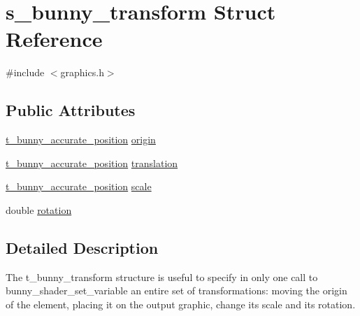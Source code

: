 \hypertarget{structs__bunny__transform}{\section{s\-\_\-bunny\-\_\-transform Struct Reference}
\label{structs__bunny__transform}
}


{\ttfamily \#include $<$graphics.\-h$>$}

\subsection*{Public Attributes}
\begin{DoxyCompactItemize}
\item 
\hyperlink{placement_8h_a0871582e90d8efb086973027e2732c21}{t\-\_\-bunny\-\_\-accurate\-\_\-position} \hyperlink{structs__bunny__transform_af634ca8a6884a87587c198a5e2349ea7}{origin}
\item 
\hyperlink{placement_8h_a0871582e90d8efb086973027e2732c21}{t\-\_\-bunny\-\_\-accurate\-\_\-position} \hyperlink{structs__bunny__transform_ac6c9543979667fa2cbe281c4be273f6d}{translation}
\item 
\hyperlink{placement_8h_a0871582e90d8efb086973027e2732c21}{t\-\_\-bunny\-\_\-accurate\-\_\-position} \hyperlink{structs__bunny__transform_aed85ef3b1defe3d9232722034440c897}{scale}
\item 
double \hyperlink{structs__bunny__transform_a379c6a4255121e72469dc9ebda7e6aca}{rotation}
\end{DoxyCompactItemize}


\subsection{Detailed Description}
The t\-\_\-bunny\-\_\-transform structure is useful to specify in only one call to bunny\-\_\-shader\-\_\-set\-\_\-variable an entire set of transformations\-: moving the origin of the element, placing it on the output graphic, change its scale and its rotation. 


